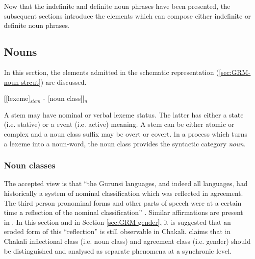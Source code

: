 \begin{exe}
\begin{exe}
\begin{exe}
\begin{exe}
\begin{exe}
\begin{exe}
Now that the indefinite and definite noun phrases have been presented, the
subsequent sections introduce the elements which can compose  either  indefinite
or  definite noun  phrases.




\subsection{Nouns}
\label{sec:GRM-noun}

In this section, the elements admitted in the
schematic representation (\ref{sec:GRM-noun-strcut}) are discussed.

\ea\label{sec:GRM-noun-strcut}
{\rm [[{\sc lexeme}]$_{stem}$ - [{\sc noun class}]]$_{n}$}
\z

A stem may have 
nominal or verbal lexeme status. The latter has either a state (i.e. stative) or
a event (i.e. active) meaning.  A stem can be either atomic or complex and a
noun class suffix may be overt or covert.  In a
 process which turns a lexeme into a noun-word,  the noun class provides the
syntactic category {\it noun}. 




\subsubsection{Noun classes}
\label{sec:GRM-noun-classes}

The accepted view is that ``the Gurunsi languages, and indeed all  languages,
had historically a system of nominal classification which was reflected in
agreement. The third person pronominal forms and other parts of speech were at a
certain time a reflection of the nominal classification''  \citep{nade89}.
 Similar affirmations are present in \citet{Mane69b, Waa71, nade82, nade98,
Tcha07}.  In this section and in Section
\ref{sec:GRM-gender}, it is suggested that
an eroded form of this ``reflection'' is still observable in Chakali.
\citet{brin08c} claims that in Chakali inflectional class
(i.e. noun class) and agreement class (i.e. gender) should be distinguished and
analysed as separate phenomena at a synchronic level.


\end{exe}
\end{exe}
\end{exe}
\end{exe}
\end{exe}
\end{exe}
